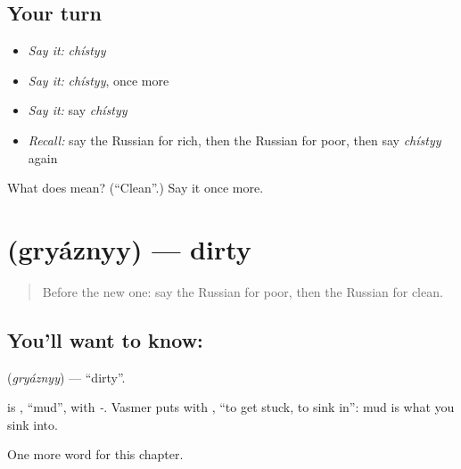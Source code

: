 \subsection*{Your turn}
\begin{itemize}
\raggedright
  \item \emph{Say it:} \emph{chístyy}
  \item \emph{Say it:} \emph{chístyy}, once more
  \item \emph{Say it:} say \emph{chístyy}
  \item \emph{Recall:} say the Russian for rich, then the Russian for poor, then say \emph{chístyy} again
\end{itemize}

\begin{tcolorbox}[breakable,colback=teal!4,colframe=teal!35!black,title={Before you move on}]
What does  mean? (\textquotedblleft{}Clean\textquotedblright{}.) Say it once more.
\end{tcolorbox}
\section[\texorpdfstring{\ru{грязный} (gryáznyy)}{грязный (gryáznyy)}]{ (gryáznyy) — dirty}

\label{lesson:RU-C156-gryaznyy}



\begin{quote}
Before the new one: say the Russian for poor, then the Russian for clean.
\end{quote}

\subsection*{You'll want to know: }
\textbf{} (\emph{gryáznyy}) — \textquotedblleft{}dirty\textquotedblright{}.

\begin{cousinweb}
\textbf{} is \emph{}, \textquotedblleft{}mud\textquotedblright{}, with \emph{-}. Vasmer puts \emph{} with \emph{}, \textquotedblleft{}to get stuck, to sink in\textquotedblright{}: mud is what you sink into.
\end{cousinweb}

\begin{grammarlens}[title={What you've built}]
One more word for this chapter.
\end{grammarlens}

